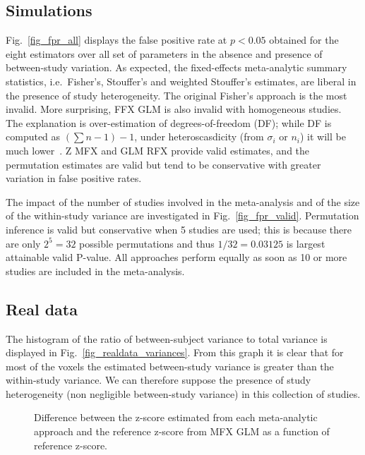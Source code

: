 \documentclass[preprint,12pt]{elsarticle}
\newcommand{\sampleSize}[1][i]{n_{#1}}
\begin{document}
\subsection{Simulations}
Fig.~\ref{fig_fpr_all} displays the false positive rate at $p<0.05$ obtained for the eight estimators over all set of parameters in the absence and presence of between-study variation. As expected, the fixed-effects meta-analytic summary statistics, i.e.\ Fisher's, Stouffer's and weighted Stouffer's estimates, are liberal in the presence of study heterogeneity. The original Fisher's approach is the most invalid. More surprising, FFX GLM is also invalid with homogeneous studies. The explanation is over-estimation of degrees-of-freedom (DF); while DF is computed as $(\sum n-1)-1$, under heteroscasdicity (from $\sigma_i$ or $\sampleSize$) it will be much lower~\cite{Satterthwaite}. Z MFX and GLM RFX provide valid estimates, and the permutation estimates are valid but tend to be conservative with greater variation in false positive rates.

The impact of the number of studies involved in the meta-analysis and of the size of the within-study variance are investigated in Fig.~\ref{fig_fpr_valid}. Permutation inference is valid but conservative when 5 studies are used; this is because there are only $2^5=32$ possible permutations and thus $1/32=0.03125$ is largest attainable valid P-value. All approaches perform equally as soon as 10 or more studies are included in the meta-analysis. 


\subsection{Real data}



The histogram of the ratio of between-subject variance to total variance is displayed in Fig.~\ref{fig_realdata_variances}. From this graph it is clear that for most of the voxels the estimated between-study variance is greater than the within-study variance. We can therefore suppose the presence of study heterogeneity (non negligible between-study variance) in this collection of studies.

\begin{figure}[t]
	\centering
	\caption{Difference between the z-score estimated from each meta-analytic approach and the reference z-score from MFX GLM as a function of reference z-score.}
	\label{fig_realdata}
\end{figure}
\end{document}

